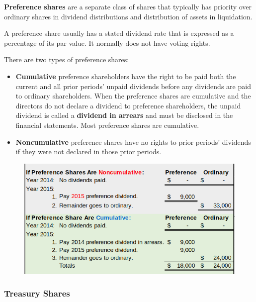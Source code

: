 \documentclass[../main.tex]{subfiles}
\begin{document}
	\textbf{Preference shares} are a separate class of shares that typically 
	has priority over ordinary shares in dividend distributions and 
	distribution of assets in liquidation.  
	
	A preference share usually has a stated dividend rate that is expressed as 
	a percentage of its par value. It normally does not have voting rights.  
	
	There are two types of preference shares:
	\begin{itemize}[noitemsep]
		\item \textbf{Cumulative} preference shareholders have the right to be 
		paid both the current and all prior periods’ unpaid dividends before 
		any dividends are paid to ordinary shareholders. When the preference 
		shares are cumulative and the directors do not declare a dividend to 
		preference shareholders, the unpaid dividend is called a 
		\textbf{dividend in arrears} and must be disclosed in the financial 
		statements. Most preference shares are cumulative.
		\item \textbf{Noncumulative} preference shares have no rights to prior 
		periods’ dividends if they were not declared in those prior periods.
	\end{itemize}
	
	\begin{figure}[ht]
		\centering
		\includegraphics[width=1\columnwidth]{images/c9/preference_shares.png}
	\end{figure}
	
	
	\subsubsection{Treasury Shares}
	
\end{document}
